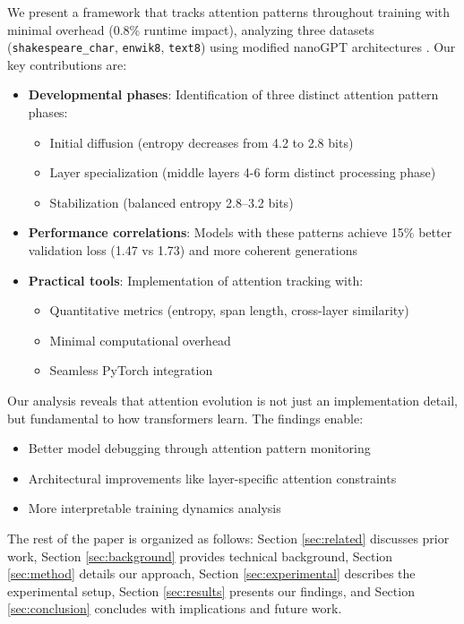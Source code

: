 \documentclass{article} %
\begin{document}
We present a framework that tracks attention patterns throughout training with minimal overhead (0.8\% runtime impact), analyzing three datasets (\texttt{shakespeare\_char}, \texttt{enwik8}, \texttt{text8}) using modified nanoGPT architectures \citep{karpathy2023nanogpt}. Our key contributions are:

\begin{itemize}
    \item \textbf{Developmental phases}: Identification of three distinct attention pattern phases:
    \begin{itemize}
        \item Initial diffusion (entropy decreases from 4.2 to 2.8 bits)
        \item Layer specialization (middle layers 4-6 form distinct processing phase)
        \item Stabilization (balanced entropy 2.8--3.2 bits)
    \end{itemize}
    
    \item \textbf{Performance correlations}: Models with these patterns achieve 15\% better validation loss (1.47 vs 1.73) and more coherent generations
    
    \item \textbf{Practical tools}: Implementation of attention tracking with:
    \begin{itemize}
        \item Quantitative metrics (entropy, span length, cross-layer similarity)
        \item Minimal computational overhead
        \item Seamless PyTorch integration \citep{paszke2019pytorch}
    \end{itemize}
\end{itemize}

Our analysis reveals that attention evolution is not just an implementation detail, but fundamental to how transformers learn. The findings enable:
\begin{itemize}
    \item Better model debugging through attention pattern monitoring
    \item Architectural improvements like layer-specific attention constraints
    \item More interpretable training dynamics analysis
\end{itemize}

The rest of the paper is organized as follows: Section \ref{sec:related} discusses prior work, Section \ref{sec:background} provides technical background, Section \ref{sec:method} details our approach, Section \ref{sec:experimental} describes the experimental setup, Section \ref{sec:results} presents our findings, and Section \ref{sec:conclusion} concludes with implications and future work.
\end{document}
